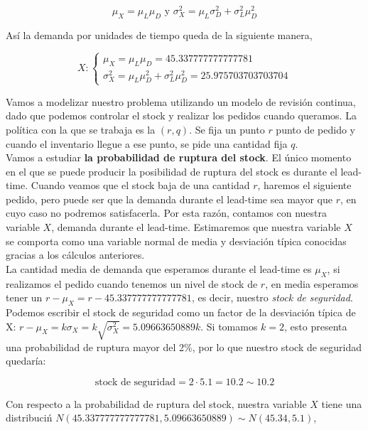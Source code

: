 \documentclass[a4paper,12pt]{article}
\begin{document}
$$\mu_X = \mu_L \mu_D \text{ y } \sigma_X^2 = \mu_L \sigma_D^2 + \sigma_L^2 \mu_D^2$$

As\'i la demanda por unidades de tiempo queda de la siguiente manera,


	\begin{equation*}
	X:  \left\lbrace \begin{array}{l}
		\mu_X = \mu_L \mu_D = 45.337777777777781\\
		\sigma_X^2 = \mu_L \mu_D^2 + \sigma_L^2 \mu_D^2 = 25.975703703703704
	\end{array}
	\right. 
	\end{equation*}

Vamos a modelizar nuestro problema utilizando un modelo de revisi\'on continua, dado que podemos controlar el stock y realizar los pedidos cuando queramos. La pol\'itica con la que se trabaja es la $(r, q)$. Se fija un punto $r$ punto de pedido y cuando el inventario llegue a ese punto, se pide una cantidad fija $q$. \\

Vamos a estudiar \textbf{la probabilidad de ruptura del stock}. El \'unico momento en el que se puede producir la posibilidad de ruptura del stock es durante el lead-time. Cuando veamos que el stock baja de una cantidad $r$, haremos el siguiente pedido, pero puede ser que la demanda durante el lead-time sea mayor que $r$, en cuyo caso no podremos satisfacerla. Por esta raz\'on, contamos con nuestra variable $X$, demanda durante el lead-time. Estimaremos que nuestra variable $X$ se comporta como una variable normal de media y desviaci\'on t\'ipica conocidas gracias a los c\'alculos anteriores.\\

La cantidad media de demanda que esperamos durante el lead-time es $\mu_X$, si realizamos el pedido cuando tenemos un nivel de stock de $r$, en media esperamos tener un $r - \mu_X = r - 45.337777777777781$, es decir, nuestro \textit{stock de seguridad}. Podemos escribir el stock de seguridad como un factor de la desviaci\'on t\'ipica de X: $r - \mu_X = k\sigma_X = k \sqrt{\sigma_X^2} =  5.09663650889 k$. Si tomamos $k = 2$, esto presenta una probabilidad de ruptura mayor del 2\%, por lo que nuestro stock de seguridad quedar\'ia:

$$ \text{stock de seguridad} = 2 \cdot 5.1 = 10.2 \sim 10.2$$

Con respecto a la probabilidad de ruptura del stock, nuestra variable $X$ tiene una distribuci\'n $N(45.337777777777781, 5.09663650889) \sim N(45.34, 5.1)$,
\end{document}
